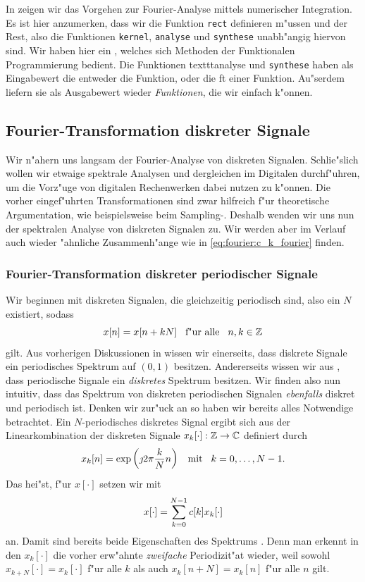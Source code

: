 In  zeigen wir das Vorgehen zur Fourier-Analyse mittels numerischer Integration.
Es ist hier anzumerken, dass wir  die Funktion \texttt{rect} definieren m"ussen und der Rest, also die Funktionen \texttt{kernel}, \texttt{analyse} und \texttt{synthese} unabh"angig hiervon sind.
Wir haben hier ein , welches sich Methoden der Funktionalen Programmierung bedient.
Die Funktionen texttt{analyse} und \texttt{synthese} haben als Eingabewert die entweder die Funktion, oder die \acrlong{ft} einer Funktion.
Au"serdem liefern sie als Ausgabewert wieder \emph{Funktionen}, die wir einfach  k"onnen.
%
\subsection{Fourier-Transformation diskreter Signale}\label{sec:fourier:disc}
%
Wir n"ahern uns langsam der Fourier-Analyse von diskreten Signalen.
Schlie"slich wollen wir etwaige spektrale Analysen und dergleichen im Digitalen durchf"uhren, um die Vorz"uge von digitalen Rechenwerken dabei nutzen zu k"onnen.
Die vorher eingef"uhrten Transformationen sind zwar hilfreich f"ur theoretische Argumentation, wie beispielsweise beim Sampling-. 
Deshalb wenden wir uns nun der spektralen Analyse von diskreten Signalen zu.
Wir werden aber im Verlauf auch wieder "ahnliche Zusammenh"ange wie in \eqref{eq:fourier:c_k_fourier} finden.
%
\subsubsection{Fourier-Transformation diskreter periodischer Signale}\label{sec:fourier:disc_period}
%
Wir beginnen mit diskreten Signalen, die gleichzeitig periodisch sind, also ein $N$ existiert, sodass
\[
x[n] = x[n+kN] {\hspace{3mm} \text{f"ur alle} \hspace{3mm}} n,k \in \mathbb{Z} 
\]
gilt.
Aus vorherigen Diskussionen in  wissen wir einerseits, dass diskrete Signale ein periodisches Spektrum auf $(0,1)$ besitzen.
Andererseits wissen wir aus , dass periodische Signale ein \emph{diskretes} Spektrum besitzen.
Wir finden also nun intuitiv, dass das Spektrum von diskreten periodischen Signalen \emph{ebenfalls} diskret und periodisch ist.
Denken wir zur"uck an  so haben wir bereits alles Notwendige betrachtet.
Ein $N$-periodisches diskretes Signal ergibt sich aus der Linearkombination der diskreten Signale $x_k[\cdot] : \mathbb{Z} \rightarrow \mathbb{C}$ definiert durch
\[
x_k[n] = \exp\left(\jmath 2 \pi \frac k N n \right) {\hspace{3mm} \text{mit} \hspace{3mm}} k = 0, \ldots, N-1.
\]
Das hei"st, f"ur $x[\cdot]$ setzen wir mit
\[
x[\cdot] = {\sum\limits_{k = 0}^{N-1}{c[k] x_k[\cdot]}}
\]
an.
Damit sind bereits beide Eigenschaften des Spektrums .
Denn man erkennt in den $x_{k}[\cdot]$ die vorher erw"ahnte \emph{zweifache} Periodizit"at wieder, weil sowohl $x_{k+N}[\cdot] = x_{k}[\cdot]$ f"ur alle $k$ als auch $x_k[n+N] = x_k[n]$ f"ur alle $n$ gilt.

